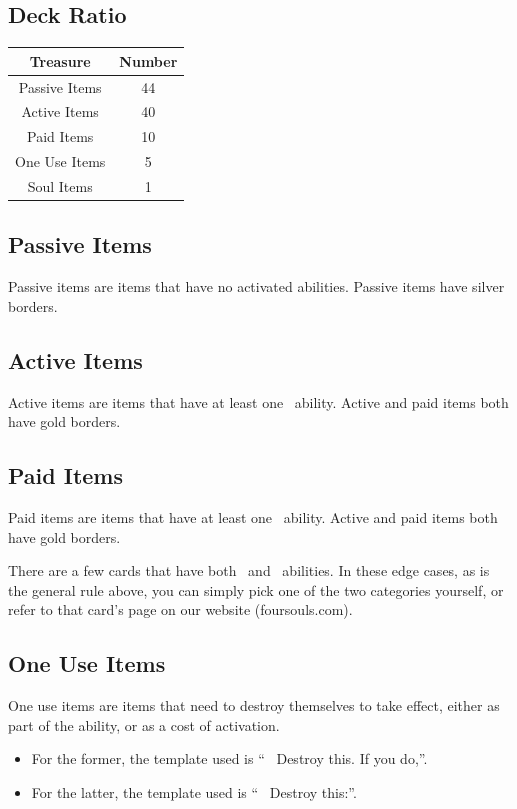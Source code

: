 \documentclass[
  fontsize=10pt,
  paper=a5,
  version=last,
  chapterprefix=true,
  bindingoffset=5mm,
  ]{scrbook}
\newcommand*{\inlineicon}[1]{%
    \raisebox{-.3\baselineskip}{%
        \smash{%
            \texttt{[image: \#1]}%
        }%
    }%
}
\newcommand{\tap}{\inlineicon{./assets/ms-tap.png}}
\newcommand{\pay}{\inlineicon{./assets/ms-paid.png}}
\begin{document}
    \subsection*{Deck Ratio}
    \begin{tabular}{ | c | c | }
        \hline
        \textbf{Treasure} & \textbf{Number}\\
        \hline 
        Passive Items & 44\\
        Active Items & 40\\
        Paid Items & 10\\
        One Use Items & 5\\
        Soul Items & 1\\
        \hline
    \end{tabular}
    \subsection*{Passive Items}
    Passive items are items that have no activated abilities. Passive items have silver borders.
    \subsection*{Active Items}
    Active items are items that have at least one \tap\ ability. Active and paid items both have gold borders.
    \subsection*{Paid Items}
    Paid items are items that have at least one \pay\ ability. Active and paid items both have gold borders.

    There are a few cards that have both \tap\ and \pay\ abilities. In these edge cases, as is the general rule above, you can simply pick one of the two categories yourself, or refer to that card’s page on our website (foursouls.com).
    \subsection*{One Use Items}
    One use items are items that need to destroy themselves to take effect, either as part of the ability, or as a cost of activation.
    \begin{itemize}
        \item For the former, the template used is “\tap\ Destroy this. If you do,”.
        \item For the latter, the template used is “\pay\ Destroy this:”.
    \end{itemize}
\end{document}
